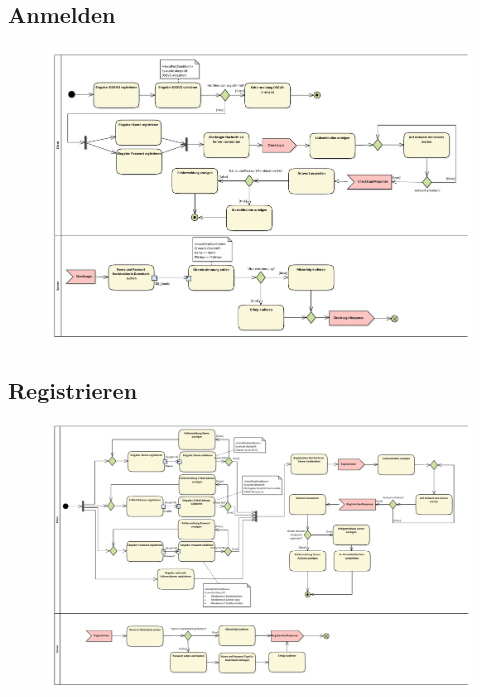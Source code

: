\vfill

\subsection*{Anmelden}
\begin{figure}[h!]
	\centering
	\includegraphics[width=0.9\linewidth]{docs/3_Aktivitaetsdiagramme/Marius/Anmelden.pdf}
	\label{fig:ActDia_Anmelden}
\end{figure}

\vfill

\subsection*{Registrieren}
\begin{figure}[h!]
	\centering
	\includegraphics[width=0.9\linewidth]{docs/3_Aktivitaetsdiagramme/Marius/Registrieren.pdf}
	\label{fig:ActDia_Registrieren}
\end{figure}

\vfill
\pagebreak
\vfill

